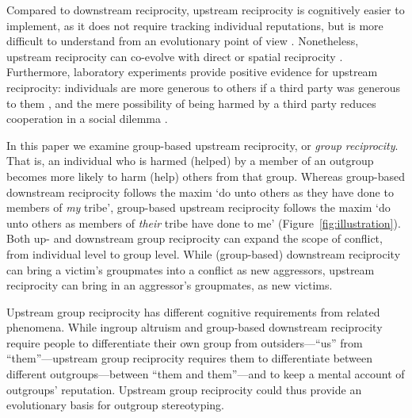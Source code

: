 \documentclass[12pt,a4paper]{article}
\begin{document}
Compared to downstream reciprocity, upstream reciprocity is cognitively easier to
implement, as it does not require tracking individual reputations, but is more
difficult to understand from an evolutionary point of view
\citep{boyd1989evolution,nowak2005evolution}. Nonetheless, upstream reciprocity
can co-evolve with direct or spatial reciprocity \citep{nowak2007upstream}.
Furthermore, laboratory experiments provide positive evidence for upstream
reciprocity: individuals are more generous to others if a third party was
generous to them \citep{dufwenberg2001direct,guth2001trust,greiner2005indirect},
and the mere possibility of being harmed by a third party reduces cooperation in
a social dilemma \citep{weisel2016social}.

In this paper we examine
group-based upstream reciprocity, or \emph{group reciprocity}. That is, an
individual who is harmed (helped) by a member of an outgroup becomes more likely
to harm (help) others from that group.  Whereas group-based downstream
reciprocity \citep{bernhard2006group,bernhard2006parochial} follows the maxim
`do unto others as they have done to members of \emph{my} tribe', group-based
upstream reciprocity follows the maxim `do unto others as members of
\emph{their} tribe have done to me' (Figure~\ref{fig:illustration}).
%
Both up- and downstream group reciprocity can  expand the scope of conflict, 
from individual level to group level. While (group-based)
downstream reciprocity can bring a victim’s groupmates into a conflict 
as new aggressors, upstream reciprocity can bring in an aggressor’s groupmates, as new victims.


Upstream group reciprocity has different cognitive requirements from
related phenomena. While ingroup altruism and group-based downstream
reciprocity require people to differentiate their own group from
outsiders---``us'' from ``them''---upstream group reciprocity requires them to
differentiate between different outgroups---between ``them and them''---and to
keep a mental account of outgroups' reputation. Upstream group reciprocity could
thus provide an evolutionary basis for outgroup stereotyping.
\end{document}
